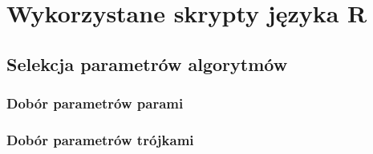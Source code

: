 \chapter{Wykorzystane skrypty języka R}
\label{ch:dodatekB-wykorzystane skrypty}
\section{Selekcja parametrów algorytmów}
\subsection{Dobór parametrów parami}
\subsection{Dobór parametrów trójkami}

